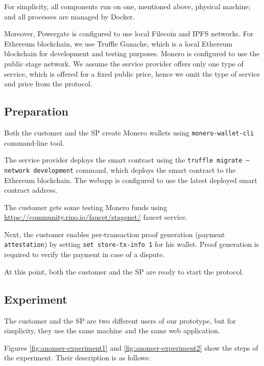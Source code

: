 For simplicity, all components run on one, mentioned above, physical machine; and all processes are managed by Docker. 

Moreover, Powergate is configured to use local Filecoin and IPFS networks.
For Ethereum blockchain, we use Truffle Ganache, which is a local Ethereum blockchain for development and testing purposes. 
Monero is configured to use the public stage network.
We assume the service provider offers only one type of service, which is offered for a fixed public price, hence we omit the type of service and price from the protocol.

\subsection*{Preparation}

Both the customer and the SP create Monero wallets using \texttt{monero-wallet-cli} command-line tool.

The service provider deploys the smart contract using the \texttt{truffle migrate --network development} command, which deploys the smart contract to the Ethereum blockchain. The webapp is configured to use the latest deployed smart contract address.

The customer gets some testing Monero funds using \url{https://community.rino.io/faucet/stagenet/} faucet service.

Next, the customer enables per-transaction proof generation (payment \texttt{attestation}) by setting \texttt{set store-tx-info 1} for his wallet. Proof generation is required to verify the payment in case of a dispute.

At this point, both the customer and the SP are ready to start the protocol.

\subsection*{Experiment}

The customer and the SP are two different users of our prototype, but for simplicity, they use the same machine and the same web application.

Figures \ref{fig:anonser-experiment1} and \ref{fig:anonser-experiment2} show the steps of the experiment. Their description is as follows:

